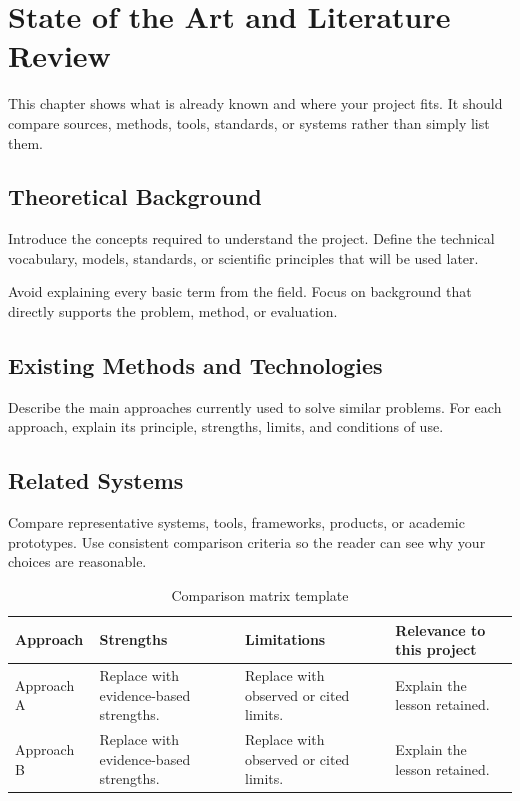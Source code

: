 \chapter{State of the Art and Literature Review}
\label{chap:state-of-the-art}

This chapter shows what is already known and where your project fits. It should compare sources, methods, tools, standards, or systems rather than simply list them.

\section{Theoretical Background}
Introduce the concepts required to understand the project. Define the technical vocabulary, models, standards, or scientific principles that will be used later.

Avoid explaining every basic term from the field. Focus on background that directly supports the problem, method, or evaluation.

\section{Existing Methods and Technologies}
Describe the main approaches currently used to solve similar problems. For each approach, explain its principle, strengths, limits, and conditions of use.


\section{Related Systems}
Compare representative systems, tools, frameworks, products, or academic prototypes. Use consistent comparison criteria so the reader can see why your choices are reasonable.

\begin{table}[H]
    \centering
    \caption{Comparison matrix template}
    \label{tab:comparison-matrix-template}
    \small
    \begin{tabular}{L{0.22\textwidth}L{0.22\textwidth}L{0.22\textwidth}L{0.24\textwidth}}
        \toprule
        \textbf{Approach} & \textbf{Strengths} & \textbf{Limitations} & \textbf{Relevance to this project} \\
        \midrule
        Approach A & Replace with evidence-based strengths. & Replace with observed or cited limits. & Explain the lesson retained. \\
        \tabrowsep
        Approach B & Replace with evidence-based strengths. & Replace with observed or cited limits. & Explain the lesson retained. \\
        \bottomrule
    \end{tabular}
\end{table}


